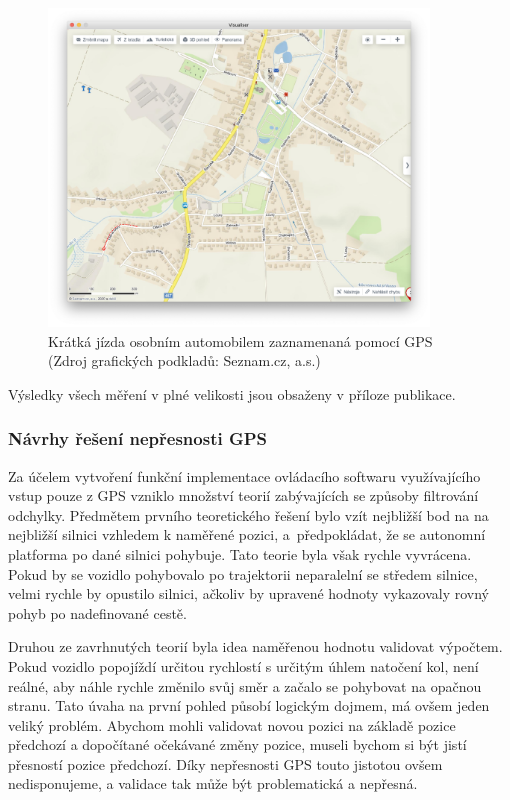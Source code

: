 \documentclass[czech, bachelor]{diploma}
\begin{document}
\begin{figure}
    \centering
    \includegraphics[width=0.9\textwidth]{Figures/olsinaautem.png}
    \caption{Krátká jízda osobním automobilem zaznamenaná pomocí GPS (Zdroj grafických podkladů: Seznam.cz, a.s.)}
    \label{fig:olsinaautem}
\end{figure}

Výsledky všech měření v plné velikosti jsou obsaženy v příloze publikace.

\subsubsection{Návrhy řešení nepřesnosti GPS}

Za účelem vytvoření funkční implementace ovládacího softwaru využívajícího vstup pouze z GPS vzniklo množství teorií zabývajících
se způsoby filtrování odchylky. Předmětem prvního teoretického řešení bylo vzít nejbližší bod na na nejbližší silnici vzhledem
k naměřené pozici, a~předpokládat, že se autonomní platforma po dané silnici pohybuje. Tato teorie byla však rychle vyvrácena.
Pokud by se vozidlo pohybovalo po trajektorii neparalelní se středem silnice, velmi rychle by opustilo silnici, ačkoliv by
upravené hodnoty vykazovaly rovný pohyb po nadefinované cestě.

Druhou ze zavrhnutých teorií byla idea naměřenou hodnotu validovat výpočtem. Pokud vozidlo popojíždí určitou rychlostí s určitým
úhlem natočení kol, není reálné, aby náhle rychle změnilo svůj směr a začalo se pohybovat na opačnou stranu. Tato úvaha na první
pohled působí logickým dojmem, má ovšem jeden veliký problém. Abychom mohli validovat novou pozici na základě pozice předchozí
a dopočítané očekávané změny pozice, museli bychom si být jistí přesností pozice předchozí. Díky nepřesnosti GPS touto jistotou
ovšem nedisponujeme, a validace tak může být problematická a nepřesná.
\end{document}
